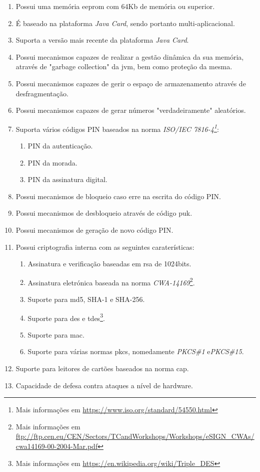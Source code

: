 \begin{enumerate}
    \item Possui uma memória \gls{eeprom} com 64Kb de memória ou superior.
    \item É baseado na plataforma \emph{Java Card}, sendo portanto multi-aplicacional.
    \item Suporta a versão mais recente da plataforma \emph{Java Card}.
    \item Possui mecanismos capazes de realizar a gestão dinâmica da sua memória, através de "garbage collection" da \gls{jvm}, bem como proteção da mesma.
    \item Possui mecanismos capazes de gerir o espaço de armazenamento através de desfragmentação.
    \item Possui mecanismos capazes de gerar números "verdadeiramente" aleatórios.
    \item Suporta vários códigos PIN baseados na norma \emph{ISO/IEC 7816-4\footnote{Mais informações em \url{https://www.iso.org/standard/54550.html}}}:
    \begin{enumerate}
        \item PIN da autenticação.
        \item PIN da morada.
        \item PIN da assinatura digital.
    \end{enumerate}
    \item Possui mecanismos de bloqueio caso erre na escrita do código PIN.
    \item Possui mecanismos de desbloqueio através de código \gls{puk}.
    \item Possui mecanismos de geração de novo código PIN.
    \item Possui criptografia interna com as seguintes caraterísticas:
    \begin{enumerate}
        \item Assinatura e verificação baseadas em \gls{rsa} de 1024bits.
        \item Assinatura eletrónica baseada na norma \emph{CWA-14169}\footnote{Mais informações em \url{ftp://ftp.cen.eu/CEN/Sectors/TCandWorkshops/Workshops/eSIGN_CWAs/cwa14169-00-2004-Mar.pdf}}.
        \item Suporte para \gls{md5}, SHA-1 e SHA-256.
        \item Suporte para \gls{des} e \gls{tdes}\footnote{Mais informações em \url{https://en.wikipedia.org/wiki/Triple_DES}}.
        \item Suporte para \gls{mac}.
        \item Suporte para várias normas \gls{pkcs}, nomedamente \emph{PKCS\#1} e\emph{PKCS\#15}.
    \end{enumerate}
    \item Suporte para leitores de cartões baseados na norma \gls{cap}.
    \item Capacidade de defesa contra ataques a nível de hardware.
\end{enumerate}

